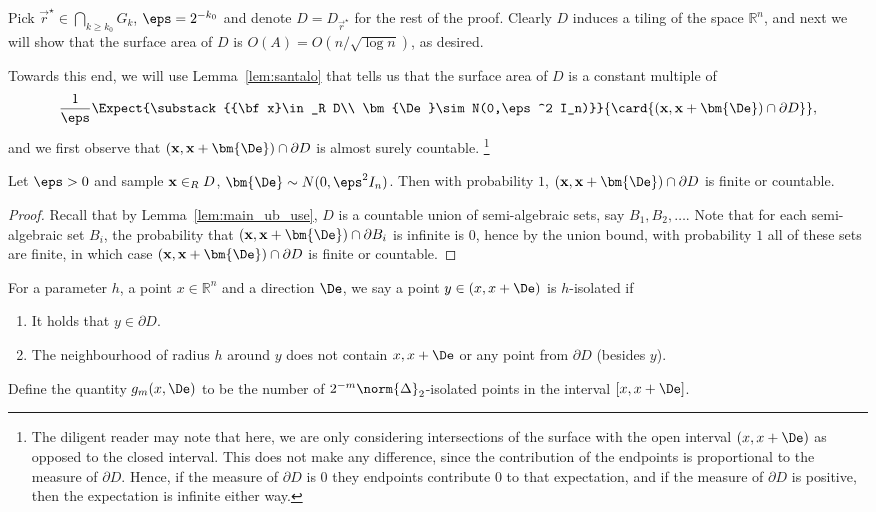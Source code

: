     Pick $\vec{r}^{\star}\in \bigcap_{k\geq k_0} G_k$, $\eps = 2^{-k_0}$ and denote $D = D_{\vec{r}^{\star}}$ for the rest of the proof. Clearly $D$ induces a tiling
    of the space $\mathbb{R}^n$, and next we will show that the surface area of $D$ is $O(A) = O(n/\sqrt{\log n})$, as desired.

    Towards this end, we will use Lemma~\ref{lem:santalo} that tells us that the surface
    area of $D$ is a constant multiple of
    \[
    \frac{1}{\eps}\Expect{\substack{{\bf x}\in_R D\\ \bm{\De}\sim N(0,\eps^2 I_n)}}{\card{({\bf x},{\bf x}+\bm{\De})\cap \partial D}},
    \]
    and we first observe that $({\bf x},{\bf x}+\bm{\De})\cap \partial D$ is almost surely countable.
    \footnote{The diligent reader may note that here, we are only considering intersections of the surface with the
    open interval $(x,x+\De)$ as opposed to the closed interval. This does not make any difference,
    since the contribution of the endpoints is proportional to the measure of $\partial D$. Hence, if the measure
    of $\partial D$ is $0$ they endpoints contribute $0$ to that expectation, and if the measure of $\partial D$
    is positive, then the expectation is infinite either way.}

    \begin{claim}\label{claim:countable}
      Let $\eps>0$ and sample ${\bf x}\in_R D$, $\bm{\De}\sim N(0,\eps^2 I_n)$. Then with probability $1$,
      $({\bf x},{\bf x}+\bm{\De})\cap \partial D$ is finite or countable.
    \end{claim}
    \begin{proof}
      Recall that by Lemma~\ref{lem:main_ub_use}, $D$ is a countable union of semi-algebraic sets, say $B_1,B_2,\ldots$.
      Note that for each semi-algebraic set $B_i$, the probability that $({\bf x},{\bf x}+\bm{\De})\cap \partial B_i$ is infinite is $0$, hence
      by the union bound, with probability $1$ all of these sets are finite, in which case $({\bf x},{\bf x}+\bm{\De})\cap \partial D$ is finite
      or countable.
    \end{proof}


    For a parameter $h$, a point $x\in\mathbb{R}^n$ and a direction $\De$, we say a
    point $y\in (x,x+\De)$ is $h$-isolated if
    \begin{enumerate}
      \item It holds that $y\in \partial D$.
      \item The neighbourhood of radius $h$ around $y$ does not contain $x,x+\De$ or any point from $\partial D$ (besides $y$).
    \end{enumerate}
    Define the quantity $g_{m}(x,\De)$ to be the number of $2^{-m}\norm{\Delta}_2$-isolated points in the interval $[x,x+\De]$.

